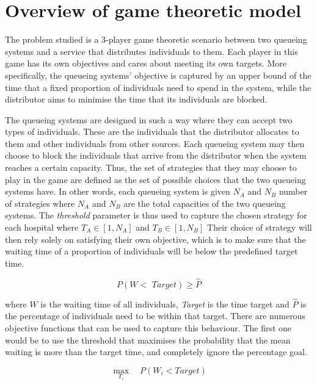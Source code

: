 \section{Overview of game theoretic model}

The problem studied is a 3-player game theoretic scenario between two queueing 
systems and a service that distributes individuals to them. 
Each player in this game has its own objectives and cares about meeting its own 
targets.
More specifically, the queueing systems' objective is captured by an upper bound
of the time that a fixed proportion of individuals need to spend in the system, 
while the distributor aims to minimise the time that its individuals 
are blocked.  

The queueing systems are designed in such a way where they can accept two types
of individuals. 
These are the individuals that the distributor allocates to them and 
other individuals from other sources. 
Each queueing system may then choose to block the individuals that arrive from 
the distributor when the system reaches a certain capacity. 
Thus, the set of strategies that they may choose to play in the game are defined 
as the set of possible choices that the two queueing systems have. 
In other words, each queueing system is given \( N_A \) and \( N_B \) number of 
strategies where \( N_A \) and \( N_B \) are the total capacities of the two 
queueing systems.
The \textit{threshold} parameter is thus used to capture the chosen 
strategy for each hospital where \( T_A \in \left[1, N_A \right] \) and 
\( T_B \in \left[1, N_B \right] \)
Their choice of strategy will then rely solely on satisfying their own 
objective, which is to make sure that the waiting time of a proportion of 
individuals will be below the predefined target time.

\begin{equation}
    P(W < \textit{ Target}) \geq \hat{P}
\end{equation}

where \(W\) is the waiting time of all individuals, \textit{Target} is the time 
target and \(\hat{P}\) is the percentage of individuals need to be within that 
target. 
There are numerous objective functions that can be used to capture this 
behaviour. 
The first one would be to use the threshold that maximises the probability that 
the mean waiting is more than the target time, and completely ignore the 
percentage goal.

\begin{equation}
    \max_{T_i} \quad P(W_i < \textit{Target})
\end{equation}

